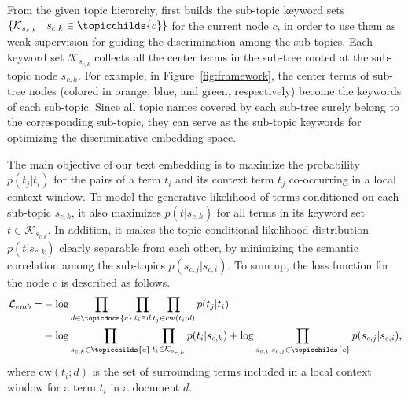 From the given topic hierarchy, \proposed first builds the sub-topic keyword sets $\{\mathcal{K}_{s_{c,k}}\mid s_{c,k}\in\topicchilds{c}\}$ for the current node $c$, in order to use them as weak supervision for guiding the discrimination among the sub-topics. 
Each keyword set $\mathcal{K}_{s_{c,k}}$ collects all the center terms in the sub-tree rooted at the sub-topic node $s_{c,k}$.
For example, in Figure~\ref{fig:framework}, the center terms of sub-tree nodes (colored in orange, blue, and green, respectively) become the keywords of each sub-topic.
Since all topic names covered by each sub-tree surely belong to the corresponding sub-topic, they can serve as the sub-topic keywords for optimizing the discriminative embedding space.

The main objective of our text embedding is to maximize the probability $p(t_j| t_i)$ for the pairs of a term $t_i$ and its context term $t_j$ co-occurring in a local context window.
To model the generative likelihood of terms conditioned on each sub-topic $s_{c,k}$, it also maximizes $p(t|s_{c,k})$ for all terms in its keyword set $t\in\mathcal{K}_{s_{c,k}}$.
In addition, it makes the topic-conditional likelihood distribution $p(t|s_{c,k})$ clearly separable from each other, by minimizing the semantic correlation among the sub-topics $p(s_{c,j}|s_{c,i})$.
To sum up, the loss function for the node $c$ is described as follows.
\begin{equation}
\label{eq:josdloss}
\begin{split}
    \mathcal{L}_{emb} = &-\log \prod_{d\in\topicdocs{c}} \prod_{t_i\in d} \prod_{t_j\in\text{cw}(t_i;d)} p(t_j|t_i) \\
    &-\log \prod_{s_{c,k}\in\topicchilds{c}}\prod_{t_i\in\mathcal{K}_{s_{c,k}}} p(t_i|s_{c,k}) +\log \prod_{s_{c,i},s_{c,j}\in\topicchilds{c}} p(s_{c,j}|s_{c,i}),
\end{split}
\raisetag{48pt}
\end{equation}
where $\text{cw}(t_i;d)$ is the set of surrounding terms included in a local context window for a term $t_i$ in a document $d$.

